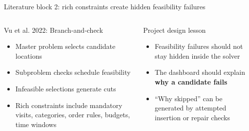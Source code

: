 \documentclass[aspectratio=169,10pt]{beamer}
\begin{document}
\begin{frame}{Literature block 2: rich constraints create hidden feasibility failures}
\begin{columns}[T,onlytextwidth]
\begin{block}{Vu et al. 2022: Branch-and-check}
\begin{itemize}
  \item Master problem selects candidate locations
  \item Subproblem checks schedule feasibility
  \item Infeasible selections generate cuts
  \item Rich constraints include mandatory visits, categories, order rules, budgets, time windows
\end{itemize}
\end{block}

\begin{block}{Project design lesson}
\begin{itemize}
  \item Feasibility failures should not stay hidden inside the solver
  \item The dashboard should explain \textbf{why a candidate fails}
  \item ``Why skipped'' can be generated by attempted insertion or repair checks
\end{itemize}
\end{block}
\end{columns}

\vspace{0.4em}
\centering
{}
\end{frame}
\end{document}
